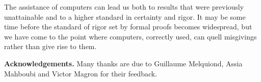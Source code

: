The assistance of computers can lead us both to results that were previously
unattainable and to a higher standard in certainty and rigor.
It may be some time before the standard of rigor set by formal proofs
becomes widespread, but we have come to the point where computers, correctly
used, can quell misgivings rather than give rise to them. 


{\bf Acknowledgements.} Many thanks are due to Guillaume Melquiond, Assia Mahboubi and Victor Magron for their feedback.
% 
% 
% 

